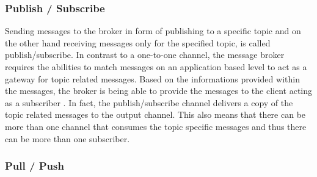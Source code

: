 \subsubsection{Publish / Subscribe}
Sending messages to the broker in form of publishing to a specific topic and on
the other hand receiving messages only for the specified topic, is called
publish/subscribe. In contrast to a one-to-one channel, the message broker
requires the abilities to match messages on an application based level to act as
a gateway for topic related messages. Based on the informations provided within
the messages, the broker is being able to provide the messages to the client
acting as a subscriber \cite{TAN06}. In fact, the publish/subscribe channel
delivers a copy of the topic related messages to the output channel. This also
means that there can be more than one channel that consumes the topic specific
messages and thus there can be more than one subscriber. \cite{EIP03}

\subsubsection{Pull / Push}

